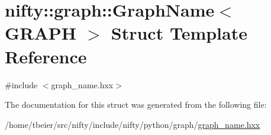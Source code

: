 \hypertarget{structnifty_1_1graph_1_1GraphName}{}\section{nifty\+:\+:graph\+:\+:Graph\+Name$<$ G\+R\+A\+PH $>$ Struct Template Reference}
\label{structnifty_1_1graph_1_1GraphName}


{\ttfamily \#include $<$graph\+\_\+name.\+hxx$>$}



The documentation for this struct was generated from the following file\+:\begin{DoxyCompactItemize}
\item 
/home/tbeier/src/nifty/include/nifty/python/graph/\hyperlink{graph__name_8hxx}{graph\+\_\+name.\+hxx}\end{DoxyCompactItemize}
